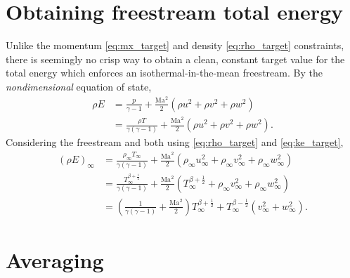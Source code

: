 \documentclass[letterpaper,11pt,nointlimits,reqno]{amsart}
\newcommand{\Mach}[1][]{\ensuremath{\mbox{Ma}_{#1}}}
\begin{document}
\section{Obtaining freestream total energy}

Unlike the momentum \eqref{eq:mx_target} and density \eqref{eq:rho_target}
constraints, there is seemingly no crisp way to obtain a clean, constant target
value for the total energy which enforces an isothermal-in-the-mean freestream.
By the \emph{nondimensional} equation of state,
\begin{align}
  \rho E &= \frac{p}{\gamma-1}
          + \frac{\Mach^2}{2}\left(\rho{}u^2 + \rho{}v^2 + \rho{}w^2\right)
\\
         &= \frac{\rho T}{\gamma\left(\gamma-1\right)}
          + \frac{\Mach^2}{2}\left(\rho{}u^2 + \rho{}v^2 + \rho{}w^2\right)
.
\end{align}
Considering the freestream and both using \eqref{eq:rho_target} and
\eqref{eq:ke_target},
\begin{align}
  \left(\rho E\right)_\infty
         &= \frac{\rho_\infty T_\infty}{\gamma\left(\gamma-1\right)}
          + \frac{\Mach^2}{2}\left(  \rho_\infty u_\infty^2
                                   + \rho_\infty v_\infty^2
                                   + \rho_\infty w_\infty^2\right)
\\
         &= \frac{T_\infty^{\beta+\frac{1}{2}}}{\gamma\left(\gamma-1\right)}
          + \frac{\Mach^2}{2}\left(  T_\infty^{\beta+\frac{1}{2}}
                                   + \rho_\infty v_\infty^2
                                   + \rho_\infty w_\infty^2\right)
\\
\label{eq:e_target}
         &= \left(  \frac{1}{\gamma\left(\gamma-1\right)}
                  + \frac{\Mach^2}{2} \right)
             T_\infty^{\beta+\frac{1}{2}}
          + T_\infty^{\beta-\frac{1}{2}} \left(v_\infty^2 + w_\infty^2\right)
.
\end{align}

\section{Averaging}
\end{document}
